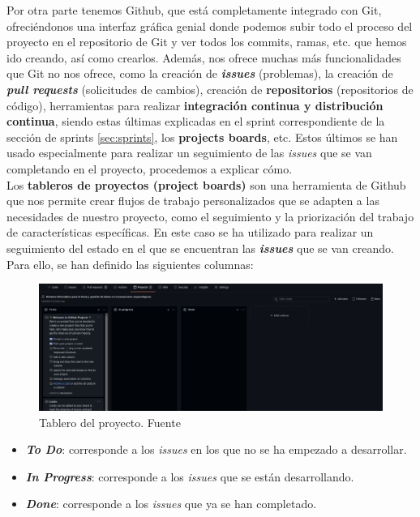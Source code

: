 Por otra parte tenemos Github, que está completamente integrado con Git, ofreciéndonos una
interfaz gráfica genial donde podemos subir todo el proceso del proyecto en el repositorio
de Git y ver todos los commits, ramas, etc. que hemos ido creando, así como crearlos.
Además, nos ofrece muchas más funcionalidades que Git no nos ofrece, como la creación de
\textbf{\textit{issues}} (problemas), la creación de \textbf{\textit{pull requests}}
(solicitudes de cambios), creación de \textbf{repositorios} (repositorios de código),
herramientas para realizar \textbf{integración continua y distribución continua}, siendo
estas últimas explicadas en el sprint correspondiente de la sección de sprints
\ref{sec:sprints}, los \textbf{projects boards}, etc. Estos últimos se han usado
especialmente para realizar un seguimiento de las \textit{issues} que se van completando en
el proyecto, procedemos a explicar cómo.\\

Los \textbf{tableros de proyectos (project boards)} \cite{project-boards} son una
herramienta de Github que nos permite crear flujos de trabajo personalizados que se adapten
a las necesidades de nuestro proyecto, como el seguimiento y la priorización del trabajo de
características específicas. En este caso se ha utilizado para realizar un seguimiento
del estado en el que se encuentran las \textbf{\textit{issues}} que se van creando. Para
ello, se han definido las siguientes columnas:

    \begin{figure}[H]
        \centering
        \includegraphics[scale=0.19]{imagenes/project-board.png}
        \caption[Tablero del proyecto]{Tablero del proyecto. Fuente \cite{project-board-image}}
        \label{fig:project-board}
    \end{figure}

    \begin{itemize}
        \item \textbf{\textit{To Do}}: corresponde a los \textit{issues} en los que no se ha
        empezado a desarrollar.
        \item \textbf{\textit{In Progress}}: corresponde a los \textit{issues} que se están
        desarrollando.
        \item \textbf{\textit{Done}}: corresponde a los \textit{issues} que ya se han
        completado.
    \end{itemize}


